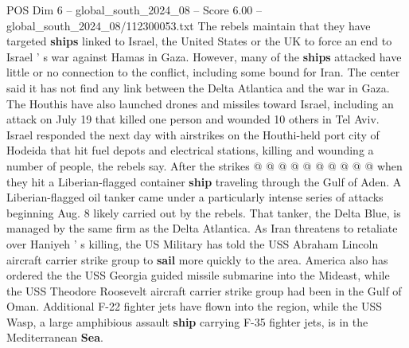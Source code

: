 \begin{textsample}{POS Dim 6 – global\_south\_2024\_08 – Score 6.00 – global\_south\_2024\_08/112300053.txt}
The rebels maintain that they have targeted \textbf{ships} linked to Israel, the United States or the UK to force an end to Israel ' s war against Hamas in Gaza.
However, many of the \textbf{ships} attacked have little or no connection to the conflict, including some bound for Iran.
The center said it has not find any link between the Delta Atlantica and the war in Gaza.
The Houthis have also launched drones and missiles toward Israel, including an attack on July 19 that killed one person and wounded 10 others in Tel Aviv.
Israel responded the next day with airstrikes on the Houthi-held port city of Hodeida that hit fuel depots and electrical stations, killing and wounding a number of people, the rebels say.
After the strikes @ @ @ @ @ @ @ @ @ @ when they hit a Liberian-flagged container \textbf{ship} traveling through the Gulf of Aden.
A Liberian-flagged oil tanker came under a particularly intense series of attacks beginning Aug. 8 likely carried out by the rebels.
That tanker, the Delta Blue, is managed by the same firm as the Delta Atlantica.
As Iran threatens to retaliate over Haniyeh ' s killing, the US Military has told the USS Abraham Lincoln aircraft carrier strike group to \textbf{sail} more quickly to the area.
America also has ordered the the USS Georgia guided missile submarine into the Mideast, while the USS Theodore Roosevelt aircraft carrier strike group had been in the Gulf of Oman.
Additional F-22 fighter jets have flown into the region, while the USS Wasp, a large amphibious assault \textbf{ship} carrying F-35 fighter jets, is in the Mediterranean \textbf{Sea}.

\end{textsample}
